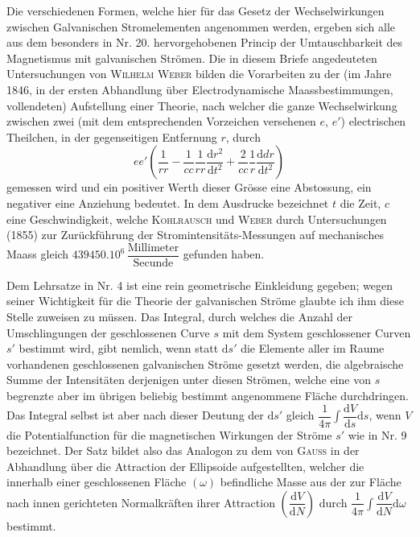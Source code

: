 Die verschiedenen Formen, welche hier für das Gesetz der Wechselwirkungen zwischen Galvanischen Stromelementen angenommen werden, ergeben sich alle aus dem besonders in Nr. 20. hervorgehobenen Princip der Umtauschbarkeit des Magnetismus mit galvanischen Strömen. Die in diesem Briefe angedeuteten Untersuchungen von \textsc{Wilhelm Weber} bilden die Vorarbeiten zu der (im Jahre 1846, in der ersten Abhandlung über Electrodynamische Maassbestimmungen, vollendeten) Aufstellung einer Theorie, nach welcher die ganze Wechselwirkung zwischen zwei (mit dem entsprechenden Vorzeichen versehenen $e$, $e'$) electrischen Theilchen, in der gegenseitigen Entfernung $r$, durch
\[
ee'\left(\frac1{rr}-\frac1{cc}\frac1{rr}\frac{\mathrm dr^2}{\mathrm dt^2}+\frac2{cc}\frac1r\frac{\mathrm ddr}{\mathrm dt^2}\right)
\]
gemessen wird und ein positiver Werth dieser Grösse eine Abstossung, ein negativer eine Anziehung bedeutet. In dem Ausdrucke bezeichnet $t$ die Zeit, $c$ eine Geschwindigkeit, welche \textsc{Kohlrausch} und \textsc{Weber} durch Untersuchungen (1855) zur Zurückführung der Stromintensitäts-Messungen auf mechanisches Maass gleich $439450.10^6\,\dfrac{\text{Millimeter}}{\text{Secunde}}$ gefunden haben.


Dem Lehrsatze in Nr. 4 ist eine rein geometrische Einkleidung gegeben; wegen seiner Wichtigkeit für die Theorie der galvanischen Ströme glaubte ich ihm diese Stelle zuweisen zu müssen. Das Integral, durch welches die Anzahl der Umschlingungen der geschlossenen Curve $s$ mit dem System geschlossener Curven $s'$ bestimmt wird, gibt nemlich, wenn statt $\mathrm ds'$ die Elemente aller im Raume vorhandenen geschlossenen galvanischen Ströme gesetzt werden, die algebraische Summe der Intensitäten derjenigen unter diesen Strömen, welche eine von $s$ begrenzte aber im übrigen beliebig bestimmt angenommene Fläche durchdringen. Das Integral selbst ist aber nach dieser Deutung der $\mathrm ds'$ gleich $\dfrac1{4\pi}\int\dfrac{\mathrm dV}{\mathrm ds}\mathrm ds$, wenn $V$ die Potentialfunction für die magnetischen Wirkungen der Ströme $s'$ wie in Nr. 9 bezeichnet. Der Satz bildet also das Analogon zu dem von \textsc{Gauss} in der Abhandlung über die Attraction der Ellipsoide aufgestellten, welcher die innerhalb einer geschlossenen Fläche $(\omega)$ befindliche Masse aus der zur Fläche nach innen gerichteten Normalkräften ihrer Attraction $\left(\dfrac{\mathrm dV}{\mathrm dN}\right)$ durch $\dfrac1{4\pi}\int\dfrac{\mathrm dV}{\mathrm dN}\mathrm d\omega$ bestimmt.

